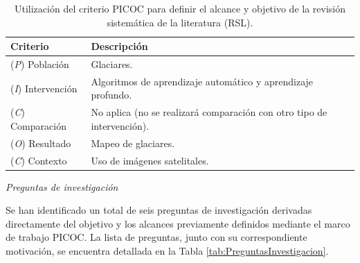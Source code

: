 \begin{table}[H]
\small
\caption{Utilización del criterio PICOC para definir el alcance y objetivo de la revisión sistemática de la literatura (RSL).\label{tab:PicocCriteria}}
\begin{tabularx}{\textwidth}{lX}
\hline
\textbf{Criterio} & \textbf{Descripción}\\
\hline
(\textit{P}) Población & Glaciares. \\ \hline
(\textit{I}) Intervención & Algoritmos de aprendizaje automático y aprendizaje profundo.\\ \hline
(\textit{C}) Comparación & No aplica (no se realizará comparación con otro tipo de intervención).\\ \hline
(\textit{O}) Resultado & Mapeo de glaciares.\\ \hline
(\textit{C}) Contexto & Uso de imágenes satelitales.\\
\hline
\end{tabularx}
\end{table}

\textit{Preguntas de investigación}

Se han identificado un total de seis preguntas de investigación derivadas directamente del objetivo y los alcances previamente definidos mediante el marco de trabajo PICOC. La lista de preguntas, junto con su correspondiente motivación, se encuentra detallada en la Tabla \ref{tab:PreguntasInvestigacion}.


